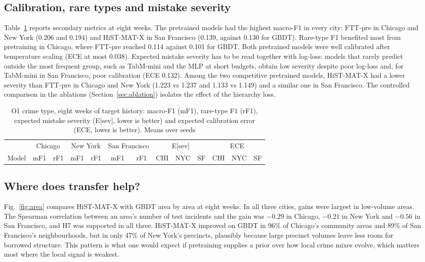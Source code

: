\documentclass[11pt]{article}
\newcommand{\HMX}{HiST-MAT-X}
\begin{document}
\subsection{Calibration, rare types and mistake severity}
Table~\ref{tab:secondary} reports secondary metrics at eight weeks. The pretrained models had the highest macro-F1 in every city: FTT-pre in Chicago and New York (0.206 and 0.194) and \HMX{} in San Francisco (0.139, against 0.130 for GBDT). Rare-type F1 benefited most from pretraining in Chicago, where FTT-pre reached 0.114 against 0.101 for GBDT. Both pretrained models were well calibrated after temperature scaling (ECE at most 0.038). Expected mistake severity has to be read together with log-loss: models that rarely predict outside the most frequent group, such as TabM-mini and the MLP at short budgets, obtain low severity despite poor log-loss and, for TabM-mini in San Francisco, poor calibration (ECE 0.132). Among the two competitive pretrained models, \HMX{} had a lower severity than FTT-pre in Chicago and New York (1.223 vs 1.237 and 1.133 vs 1.149) and a similar one in San Francisco. The controlled comparison in the ablations (Section~\ref{sec:ablation}) isolates the effect of the hierarchy loss.

\begin{table}[!htbp]
\centering
\caption{O1 crime type, eight weeks of target history: macro-F1 (mF1), rare-type F1 (rF1), expected mistake severity (E[sev], lower is better) and expected calibration error (ECE, lower is better). Means over seeds}
\label{tab:secondary}
\footnotesize
\setlength{\tabcolsep}{3pt}
\begin{tabular}{lcccccccccccc}
\toprule
 & \multicolumn{2}{c}{Chicago} & \multicolumn{2}{c}{New York} & \multicolumn{2}{c}{San Francisco} & \multicolumn{3}{c}{E[sev]} & \multicolumn{3}{c}{ECE} \\
\cmidrule(lr){2-3}\cmidrule(lr){4-5}\cmidrule(lr){6-7}\cmidrule(lr){8-10}\cmidrule(lr){11-13}
Model & mF1 & rF1 & mF1 & rF1 & mF1 & rF1 & CHI & NYC & SF & CHI & NYC & SF \\
\midrule

\bottomrule
\end{tabular}
\end{table}

\subsection{Where does transfer help?}
Fig.~\ref{fig:area} compares \HMX{} with GBDT area by area at eight weeks. In all three cities, gains were largest in low-volume areas. The Spearman correlation between an area's number of test incidents and the gain was $-0.29$ in Chicago, $-0.21$ in New York and $-0.56$ in San Francisco, and H7 was supported in all three. \HMX{} improved on GBDT in 96\% of Chicago's community areas and 89\% of San Francisco's neighbourhoods, but in only 47\% of New York's precincts, plausibly because large precinct volumes leave less room for borrowed structure. This pattern is what one would expect if pretraining supplies a prior over how local crime mixes evolve, which matters most where the local signal is weakest.
\end{document}
